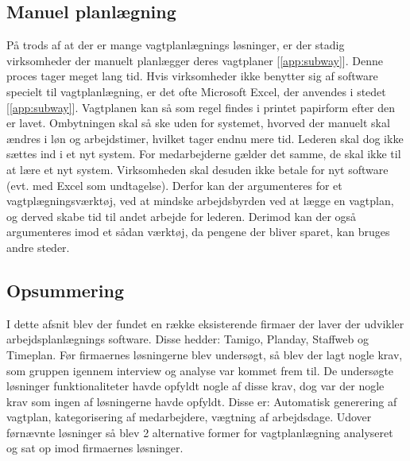 \subsection{Manuel planlægning}
På trods af at der er mange vagtplanlægnings løsninger, er der stadig virksomheder der manuelt planlægger deres vagtplaner [\ref{app:subway}]. Denne proces tager meget lang tid. Hvis virksomheder ikke benytter sig af software specielt til vagtplanlægning, er det ofte Microsoft Excel, der anvendes i stedet [\ref{app:subway}]. Vagtplanen kan så som regel findes i printet papirform efter den er lavet. Ombytningen skal så ske uden for systemet, hvorved der manuelt skal ændres i løn og arbejdstimer, hvilket tager endnu mere tid. Lederen skal dog ikke sættes ind i et nyt system. For medarbejderne gælder det samme, de skal ikke til at lære et nyt system. Virksomheden skal desuden ikke betale for nyt software (evt. med Excel som undtagelse). Derfor kan der argumenteres for et vagtplægningsværktøj, ved at mindske arbejdsbyrden ved at lægge en vagtplan, og derved skabe tid til andet arbejde for lederen. Derimod kan der også argumenteres imod et sådan værktøj, da pengene der bliver sparet, kan bruges andre steder.

\subsection{Opsummering}
I dette afsnit blev der fundet en række eksisterende firmaer der laver der udvikler arbejdsplanlægnings software. Disse hedder: Tamigo, Planday, Staffweb og Timeplan. Før firmaernes løsningerne blev undersøgt, så blev der lagt nogle krav, som gruppen igennem interview og analyse var kommet frem til. De undersøgte løsninger funktionaliteter havde opfyldt nogle af disse krav, dog var der nogle krav som ingen af løsningerne havde opfyldt. Disse er: Automatisk generering af vagtplan, kategorisering af medarbejdere, vægtning af arbejdsdage. Udover førnævnte løsninger så blev 2 alternative former for vagtplanlægning analyseret og sat op imod firmaernes løsninger. 


